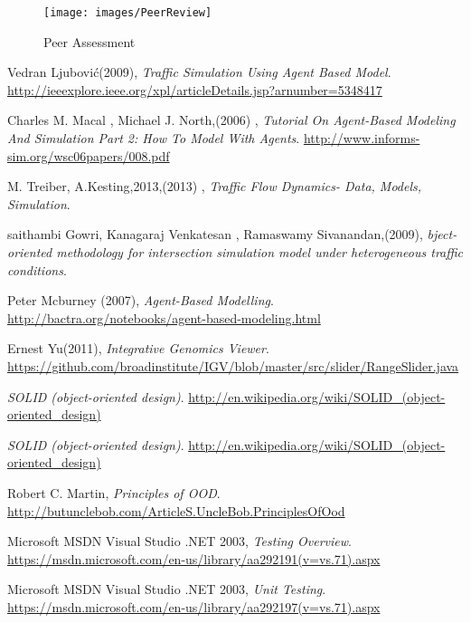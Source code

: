 \documentclass[11pt,a4paper]{article}
\begin{document}
\begin{figure}[h!]
			\texttt{[image: images/PeerReview]}
			\caption{Peer Assessment}
			\centering
		\end{figure}

\renewcommand{\refname}{REFERENCES}

\begin{thebibliography}{9}	
	
	
	Vedran Ljubović(2009),	
	\emph{Traffic Simulation Using Agent Based Model}.	
	\url{http://ieeexplore.ieee.org/xpl/articleDetails.jsp?arnumber=5348417}
	
	Charles M. Macal , Michael J. North,(2006) ,	
	\emph{Tutorial On Agent-Based Modeling And Simulation Part 2: How To Model With Agents}.	
	\url{http://www.informs-sim.org/wsc06papers/008.pdf}


	M. Treiber, A.Kesting,2013,(2013) ,	
	\emph{Traffic Flow Dynamics- Data, Models, Simulation}.	
	
	saithambi Gowri, Kanagaraj Venkatesan , Ramaswamy Sivanandan,(2009),	
	\emph{bject-oriented methodology for intersection simulation model under heterogeneous traffic conditions}.		
	
	Peter Mcburney (2007),
	\emph{Agent-Based Modelling}.
	\url{http://bactra.org/notebooks/agent-based-modeling.html}
	

	
	Ernest Yu(2011),
	\emph{Integrative Genomics Viewer}.
	\url{https://github.com/broadinstitute/IGV/blob/master/src/slider/RangeSlider.java}
	
	\emph{SOLID 	(object-oriented design)}.	
	\url{http://en.wikipedia.org/wiki/SOLID_(object-oriented_design)}

		
	\emph{SOLID 	(object-oriented design)}.	
	\url{http://en.wikipedia.org/wiki/SOLID_(object-oriented_design)}	
	
	Robert C. Martin,	
	\emph{Principles of OOD}.	
	\url{http://butunclebob.com/ArticleS.UncleBob.PrinciplesOfOod}
	
	Microsoft MSDN Visual Studio .NET 2003,
	\emph{Testing Overview}.
	\url{https://msdn.microsoft.com/en-us/library/aa292191(v=vs.71).aspx}
	
	Microsoft MSDN Visual Studio .NET 2003,
	\emph{Unit Testing}.
	\url{https://msdn.microsoft.com/en-us/library/aa292197(v=vs.71).aspx}
	

\end{thebibliography}
\end{document}
